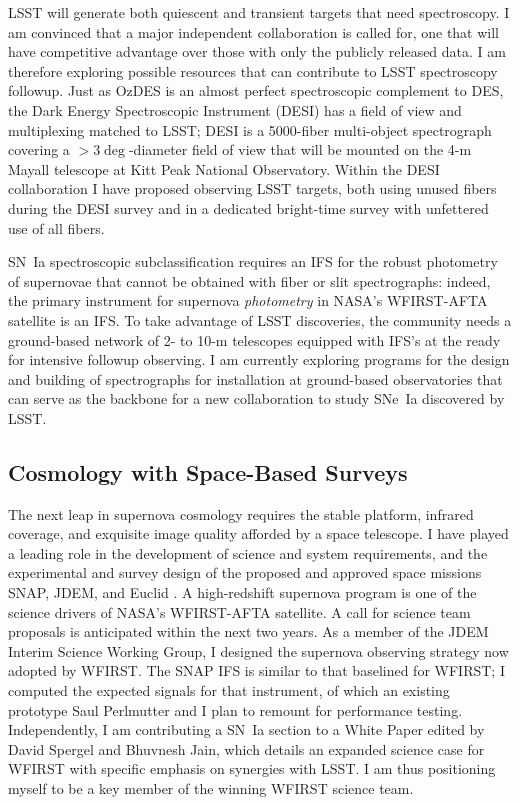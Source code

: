 \documentclass[12pt]{article}
\begin{document}
LSST will generate both quiescent and transient targets that need spectroscopy.  I am convinced that
a major independent collaboration is called for, one that will have competitive advantage over those with only
the publicly released data.
I am therefore exploring possible resources that can contribute to LSST spectroscopy followup.
Just as OzDES is an almost perfect spectroscopic complement to  DES, 
the Dark Energy Spectroscopic Instrument (DESI)  has a field of view and multiplexing matched to LSST;
DESI is a 5000-fiber multi-object spectrograph covering a $>3\deg$-diameter
field of view that will be mounted on the 4-m Mayall telescope at Kitt Peak National Observatory.   Within the DESI collaboration I have proposed observing LSST targets, both using unused fibers during the
DESI survey and in a dedicated bright-time survey
with unfettered use of all fibers.

SN~Ia spectroscopic subclassification requires an IFS for
the robust photometry of supernovae that cannot be obtained with fiber or slit spectrographs:
indeed, the primary  instrument for supernova {\it photometry} in NASA's WFIRST-AFTA satellite is an IFS.  To take
advantage of LSST discoveries, the community needs a ground-based
network of 2- to 10-m telescopes equipped with  IFS's at the ready for intensive followup observing.  I am currently exploring
programs for the design and building of spectrographs for installation at ground-based
observatories that  can serve as the backbone for a
new collaboration to study SNe~Ia discovered by LSST. 

\subsection{Cosmology with Space-Based Surveys}
The next leap in supernova cosmology requires the stable platform, infrared coverage, and exquisite image
quality afforded by a space telescope.  I have played a leading role in the development
of science and system requirements, and the experimental and survey design of the proposed
and approved space missions SNAP, JDEM, and Euclid
\cite{2006PASP..118..205D, 2011PASP..123..470S, 2013Fourspring, 2014arXiv1409.8562A}.
A  high-redshift supernova program is one of the science 
drivers of
NASA's WFIRST-AFTA satellite.  A call for science team
proposals is anticipated  within the next two years.  As a member of the JDEM Interim Science Working Group, I designed the
supernova observing strategy now adopted by WFIRST.
The SNAP IFS is similar to that baselined for WFIRST; I computed the expected signals for that instrument,
of which an existing prototype Saul Perlmutter and I plan to remount for performance testing.
Independently, I am contributing a SN~Ia  section to a White Paper 
edited by David Spergel and Bhuvnesh
Jain, which details an expanded science case for WFIRST with specific emphasis
on synergies with LSST.  I am thus positioning myself to be a key member of the winning WFIRST science
team.
\end{document}

